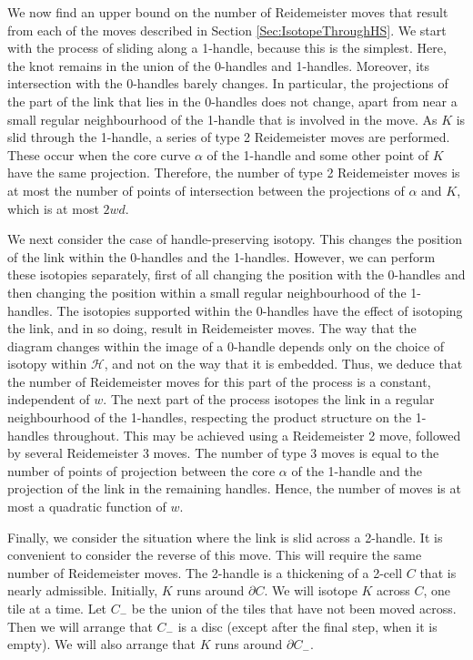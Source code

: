 \documentclass[oneside]{amsart}
\numberwithin{equation}{section}
\theoremstyle{plain}
\theoremstyle{definition}
\begin{document}
We now find an upper bound on the number of Reidemeister moves that result from each of
the moves described in Section \ref{Sec:IsotopeThroughHS}. We start with the process of sliding along a 1-handle,
because this is the simplest. Here, the knot remains in the union of the 0-handles and 1-handles. Moreover, its
intersection with the 0-handles barely changes. In particular, the projections of the part of
the link that lies in the 0-handles does not change, apart from near a small regular neighbourhood
of the 1-handle that is involved in the move. As $K$ is
slid through the 1-handle, a series of type 2 Reidemeister moves are performed.
These occur when the core curve $\alpha$ of the 1-handle and some other point of $K$
have the same projection. Therefore, the number of type 2 Reidemeister moves is at most
the number of points of intersection between the projections of $\alpha$ and $K$, which is at most
$2wd$.

We next consider the case of handle-preserving isotopy. This changes the position of the
link within the 0-handles and the 1-handles. However, we can perform these isotopies
separately, first of all changing the position with the 0-handles and then changing the
position within a small regular neighbourhood of the 1-handles. The isotopies supported
within the 0-handles have the effect of isotoping the link, and in so doing, result in
Reidemeister moves. The way that the diagram changes within the image of a 0-handle
depends only on the choice of isotopy within $\mathcal{H}$, and not on the way that it is
embedded. Thus, we deduce that the number of Reidemeister moves for this part of
the process is a constant, independent of $w$. The next part of the process isotopes
the link in a regular neighbourhood of the 1-handles, respecting the product structure
on the 1-handles throughout. This may be achieved using a Reidemeister 2 move,
followed by several Reidemeister 3 moves. The
number of type 3 moves is equal to the number of points of projection between the
core $\alpha$ of the 1-handle and the projection of the link in the remaining handles.
Hence, the number of moves is at most a quadratic function of $w$.

Finally, we consider the situation where the link is slid across a 2-handle. It is convenient
to consider the reverse of this move. This will require the same number of Reidemeister moves.
The 2-handle is a thickening of a 2-cell $C$ that is nearly admissible. Initially, $K$ runs
around $\partial C$. We will isotope $K$ across $C$, one tile at a time. Let $C_-$ be the
union of the tiles that have not been moved across. Then we will arrange that $C_-$ is
a disc (except after the final step, when it is empty). We will also arrange that $K$ runs
around $\partial C_-$.
\end{document}
